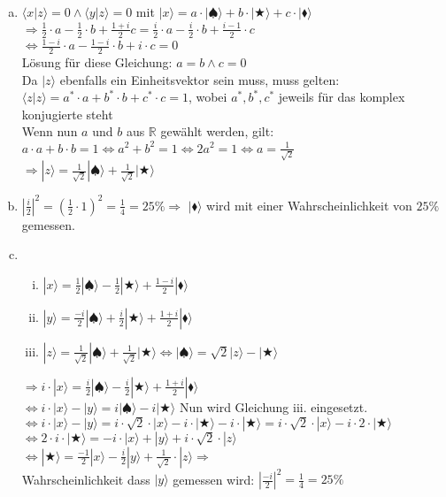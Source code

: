 \documentclass[a4paper]{scrartcl}
\begin{document}
\begin{enumerate}[a)]
\item $\langle x|z\rangle=0 \wedge \langle y|z\rangle=0$ mit $|x\rangle = a\cdot|\spadesuit\rangle+b\cdot|\bigstar\rangle+c\cdot|\blacklozenge\rangle$\\
$\Rightarrow \frac{1}{2}\cdot a-\frac{1}{2}\cdot b+\frac{1+i}{2}c = \frac{i}{2}\cdot a- \frac{i}{2}\cdot b+\frac{i-1}{2}\cdot c$\\
$\Leftrightarrow \frac{1-i}{2} \cdot a- \frac{1-i}{2} \cdot b + i \cdot c =0$\\
Lösung für diese Gleichung: $a=b \wedge c=0$\\
Da $|z\rangle$ ebenfalls ein Einheitsvektor sein muss, muss gelten:\\
$\langle z|z\rangle=a^*\cdot a+ b^* \cdot b + c^* \cdot c =1$, wobei $a^*, b^*, c^*$ jeweils für das komplex konjugierte steht\\
Wenn nun $a$ und $b$ aus $\mathbb{R}$ gewählt werden, gilt:\\
$a\cdot a+ b \cdot b =1 \Leftrightarrow a^2+b^2= 1 \Leftrightarrow 2a^2=1 \Leftrightarrow a =\frac{1}{\sqrt{2}}$\\
$\Rightarrow |z\rangle= \frac{1}{\sqrt{2}}|\spadesuit\rangle+\frac{1}{\sqrt{2}}|\bigstar\rangle$

\item $|\frac{i}{2}|^2= (\frac{1}{2}\cdot 1)^2=\frac{1}{4}=25\% \Rightarrow$ $|\blacklozenge\rangle$ wird mit einer Wahrscheinlichkeit von $25\%$ gemessen.

\item \begin{enumerate}[i.]
\item $|x\rangle= \frac{1}{2}|\spadesuit\rangle-\frac{1}{2}|\bigstar\rangle+\frac{1-i}{2}|\blacklozenge\rangle$
\item $|y\rangle= \frac{-i}{2}|\spadesuit\rangle+\frac{i}{2}|\bigstar\rangle+\frac{1+i}{2}|\blacklozenge\rangle$
\item $|z\rangle= \frac{1}{\sqrt{2}}|\spadesuit\rangle+\frac{1}{\sqrt{2}}|\bigstar\rangle \Leftrightarrow |\spadesuit\rangle = \sqrt{2}|z\rangle-|\bigstar\rangle$
\end{enumerate}

$\Rightarrow i \cdot |x\rangle = \frac{i}{2}|\spadesuit\rangle-\frac{i}{2}|\bigstar\rangle+\frac{1+i}{2}|\blacklozenge\rangle$\\
$\Leftrightarrow i \cdot |x\rangle -|y\rangle = i|\spadesuit\rangle-i|\bigstar\rangle$ Nun wird Gleichung iii. eingesetzt.\\
$\Leftrightarrow i \cdot |x\rangle -|y\rangle = i\cdot \sqrt{2}\cdot|x\rangle-i\cdot|\bigstar\rangle-i\cdot|\bigstar\rangle= i\cdot \sqrt{2}\cdot|x\rangle-i\cdot 2\cdot |\bigstar\rangle$\\
$\Leftrightarrow 2\cdot i\cdot|\bigstar\rangle= -i \cdot|x\rangle+|y\rangle+i\cdot \sqrt{2} \cdot |z\rangle$\\
$\Leftrightarrow |\bigstar\rangle= \frac{-1}{2}|x\rangle-\frac{i}{2}|y\rangle+\frac{1}{\sqrt{2}}\cdot |z\rangle \Rightarrow$\\
Wahrscheinlichkeit dass $|y\rangle$ gemessen wird: $|\frac{-i}{2}|^2=\frac{1}{4}=25\%$


\end{enumerate}
\end{document}
